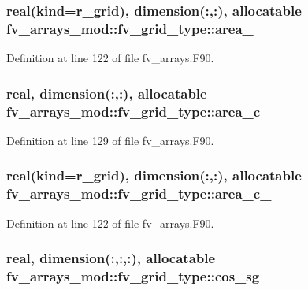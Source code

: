 \subsubsection[{area\-\_\-64}]{\setlength{\rightskip}{0pt plus 5cm}real(kind={\bf r\-\_\-grid}), dimension(\-:,\-:), allocatable fv\-\_\-arrays\-\_\-mod\-::fv\-\_\-grid\-\_\-type\-::area\-\_}\label{structfv__arrays__mod_1_1fv__grid__type_a2f41c4214f60282af69a29bc6595b1ba}


Definition at line 122 of file fv\-\_\-arrays.\-F90.

\subsubsection[{area\-\_\-c}]{\setlength{\rightskip}{0pt plus 5cm}real, dimension(\-:,\-:), allocatable fv\-\_\-arrays\-\_\-mod\-::fv\-\_\-grid\-\_\-type\-::area\-\_\-c}\label{structfv__arrays__mod_1_1fv__grid__type_a3ca9fa6025d14276c65dfbb0cfb579dd}


Definition at line 129 of file fv\-\_\-arrays.\-F90.

\subsubsection[{area\-\_\-c\-\_\-64}]{\setlength{\rightskip}{0pt plus 5cm}real(kind={\bf r\-\_\-grid}), dimension(\-:,\-:), allocatable fv\-\_\-arrays\-\_\-mod\-::fv\-\_\-grid\-\_\-type\-::area\-\_\-c\-\_}\label{structfv__arrays__mod_1_1fv__grid__type_ad158e67cf5e91973c2d93a9a6f14c884}


Definition at line 122 of file fv\-\_\-arrays.\-F90.

\subsubsection[{cos\-\_\-sg}]{\setlength{\rightskip}{0pt plus 5cm}real, dimension(\-:,\-:,\-:), allocatable fv\-\_\-arrays\-\_\-mod\-::fv\-\_\-grid\-\_\-type\-::cos\-\_\-sg}\label{structfv__arrays__mod_1_1fv__grid__type_a8f95e104b30c7e50479e333e64017993}


